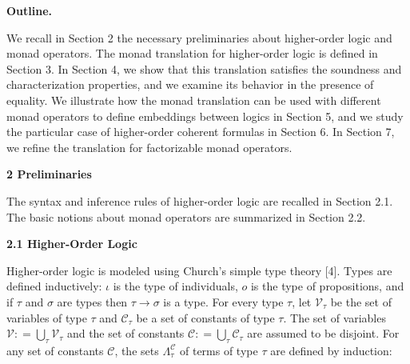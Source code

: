 \documentclass[10pt,a4paper]{article}
\begin{document}
 
\par\medskip\noindent\textbf{Outline.}\par
 
 
We recall in Section 2 the necessary preliminaries about higher-order logic and monad operators. The monad translation for higher-order logic is defined in Section 3. In Section 4, we show that this translation satisfies the soundness and characterization properties, and we examine its behavior in the presence of equality. We illustrate how the monad translation can be used with different monad operators to define embeddings between logics in Section 5, and we study the particular case of higher-order coherent formulas in Section 6. In Section 7, we refine the translation for factorizable monad operators.\par
 
 
 


 
\par\medskip\noindent\textbf{2 Preliminaries}\par
 
 
The syntax and inference rules of higher-order logic are recalled in Section 2.1. The basic notions about monad operators are summarized in Section 2.2.\par
 
 
 
\par\medskip\noindent\textbf{2.1 Higher-Order Logic}\par
 
 
Higher-order logic is modeled using Church’s simple type theory [4]. Types are defined inductively: $\iota$ is the type of individuals, $o$ is the type of propositions, and if $\tau$ and $\sigma$ are types then $\tau\rightarrow\sigma$ is a type. For every type $\tau$, let $\mathcal{V}_{\tau}$ be the set of variables of type $\tau$ and $\mathcal{C}_{\tau}$ be a set of constants of type $\tau$. The set of variables $\mathcal{V}\mathrel{\mathop{:}}=\bigcup_{\tau}\mathcal{V}_{\tau}$ and the set of constants $\mathcal{C}\mathrel{\mathop{:}}=\bigcup_{\tau}\mathcal{C}_{\tau}$ are assumed to be disjoint. For any set of constants $\mathcal{C}$, the sets $\Lambda^{\mathcal{C}}_{\tau}$ of terms of type $\tau$ are defined by induction:\par
  
\end{document}

